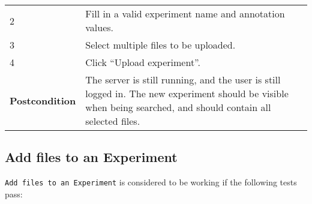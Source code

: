 \begin{longtable}[c]{@{}ll@{}}
\begin{minipage}[t]{0.31\columnwidth}
2
\strut\end{minipage} &
\begin{minipage}[t]{0.63\columnwidth}\raggedright\strut
Fill in a valid experiment name and annotation values.
\strut\end{minipage}\tabularnewline
\begin{minipage}[t]{0.31\columnwidth}\raggedright\strut
3
\strut\end{minipage} &
\begin{minipage}[t]{0.63\columnwidth}\raggedright\strut
Select multiple files to be uploaded.
\strut\end{minipage}\tabularnewline
\begin{minipage}[t]{0.31\columnwidth}\raggedright\strut
4
\strut\end{minipage} &
\begin{minipage}[t]{0.63\columnwidth}\raggedright\strut
Click ``Upload experiment''.
\strut\end{minipage}\tabularnewline
\begin{minipage}[t]{0.31\columnwidth}\raggedright\strut
\textbf{Postcondition}
\strut\end{minipage} &
\begin{minipage}[t]{0.63\columnwidth}\raggedright\strut
The server is still running, and the user is still logged in. The new
experiment should be visible when being searched, and should contain all
selected files.
\strut\end{minipage}\tabularnewline
\bottomrule
\end{longtable}

\pagebreak

\subsection{Add files to an
Experiment}\label{add-files-to-an-experiment}

\texttt{Add\ files\ to\ an\ Experiment} is considered to be working if
the following tests pass:

